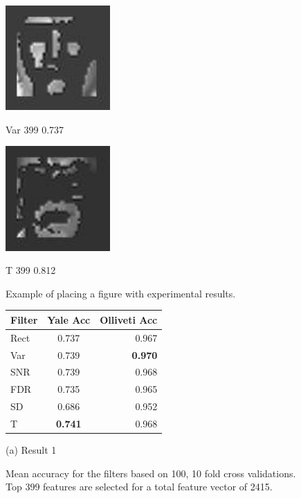 \documentclass{article}
\begin{document}
\begin{figure}[htb]

\begin{minipage}[b]{.48\linewidth}
  \centering
  \centerline{\includegraphics[width=4.0cm]{recon/varF_399_yaleWL}}
  \centerline{Var 399 0.737}\medskip
\end{minipage}
\hfill
\begin{minipage}[b]{0.48\linewidth}
  \centering
  \centerline{\includegraphics[width=4.0cm]{recon/tF_399_yaleWL}}
  \centerline{T 399 0.812}\medskip
\end{minipage}
%
\caption{Example of placing a figure with experimental results.}
\label{fig:res}
%
\end{figure}


\begin{figure}[htb]

\begin{minipage}[b]{1.0\linewidth}
  \centering
    \begin{tabular}{ | l || c | r |}
    \hline
    Filter & Yale Acc & Olliveti Acc \\ \hline
    Rect & 0.737 & 0.967 \\ \hline
    Var & 0.739 & \textbf{0.970} \\ \hline 
    SNR & 0.739 & 0.968 \\ \hline
    FDR & 0.735 & 0.965 \\ \hline
    SD & 0.686 & 0.952 \\ \hline
    T & \textbf{0.741} & 0.968 \\
    \hline
    \end{tabular}
  \centerline{(a) Result 1}\medskip
\end{minipage}
%
\caption{Mean accuracy for the filters based on 100, 10 fold cross validations. Top 399 features are
selected for a total feature vector of 2415.}
\label{fig:res}
%
\end{figure}
\end{document}
